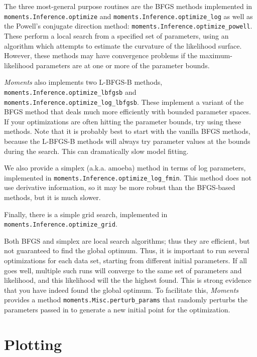 \documentclass[12pt]{article}
\makeatletter
\newcommand{\py}[1]{\lstinline[breaklines=true,language=Python, showstringspaces=False]@#1@}
\makeatother
\begin{document}
The three most-general purpose routines are the BFGS methods implemented in \py{moments.Inference.optimize} and \py{moments.Inference.optimize_log} as well as the Powell's conjugate direction method: \py{moments.Inference.optimize_powell}.
These perform a local search from a specified set of parameters, using an algorithm which attempts to estimate the curvature of the likelihood surface.
However, these methods may have convergence problems if the maximum-likelihood parameters are at one or more of the parameter bounds.

\textit{Moments} also implements two L-BFGS-B methods, \py{moments.Inference.optimize_lbfgsb} and \py{moments.Inference.optimize_log_lbfgsb}.
These implement a variant of the BFGS method that deals much more efficiently with bounded parameter spaces.
If your optimizations are often hitting the parameter bounds, try using these methods.
Note that it is probably best to start with the vanilla BFGS methods, because the L-BFGS-B methods will always try parameter values at the bounds during the search.
This can dramatically slow model fitting.

We also provide a simplex (a.k.a. amoeba) method in terms of log parameters, implemented in \py{moments.Inference.optimize_log_fmin}.
This method does not use derivative information, so it may be more robust than the BFGS-based methods, but it is much slower.

Finally, there is a simple grid search, implemented in \py{moments.Inference.optimize_grid}.

Both BFGS and simplex are local search algorithms; thus they are efficient, but not guaranteed to find the global optimum.
Thus, it is important to run several optimizations for each data set, starting from different initial parameters.
If all goes well, multiple such runs will converge to the same set of parameters and likelihood, and this likelihood will the the highest found.
This is strong evidence that you have indeed found the global optimum.
To facilitate this, \textit{Moments} provides a method \py{moments.Misc.perturb_params} that randomly perturbs the parameters passed in to generate a new initial point for the optimization.



\section{Plotting}
\end{document}
